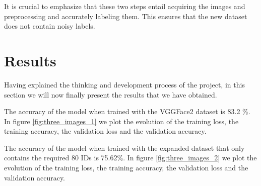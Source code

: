 \documentclass[11pt, a4paper]{article}
\numberwithin{equation}{subsection}
\begin{document}
It is crucial to emphasize that these two steps entail acquiring the images and preprocessing and accurately labeling them. This ensures that the new dataset does not contain noisy labels.


\section{Results}\label{results_section}

Having explained the thinking and development process of the project, in this section we will now finally present the results that we have obtained.

The accuracy of the model when trained with the VGGFace2 dataset is 83.2 \%. In figure \ref{fig:three_images_1} we plot the evolution of the training loss, the training accuracy, the validation loss and the validation accuracy.

The accuracy of the model when trained with the expanded dataset that only contains the required 80 IDs is 75.62\%. In figure \ref{fig:three_images_2} we plot the evolution of the training loss, the training accuracy, the validation loss and the validation accuracy.
\end{document}
